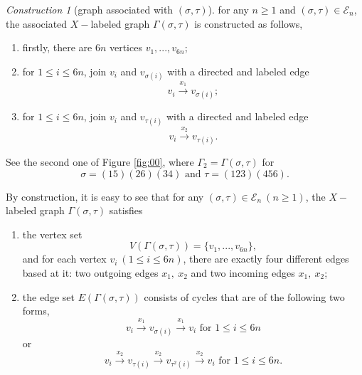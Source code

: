 \documentclass{amsart}
\theoremstyle{plain}
\theoremstyle{definition}
\theoremstyle{remark}
\newtheorem*{Cons*}{Construction}
\begin{document}
\begin{Cons*}[graph associated with $(\sigma,\tau)$]
    for any $n\geq 1$ and $(\sigma,\tau)\in\mathcal{E}_n$, the associated $X-$labeled graph $\Gamma(\sigma,\tau)$ is constructed as follows,
\begin{enumerate}
    \item  firstly, there are $6n$ vertices $v_1,...,v_{6n}$;
    \item for $1\leq i\leq 6n$, join $v_i$ and $v_{\sigma(i)}$ with a directed and labeled edge 
    $$v_i\overset{x_1}{\to}v_{\sigma(i)};$$
    \item for $1\leq i\leq 6n$, join $v_i$ and $v_{\tau(i)}$ with a directed and labeled edge 
    $$v_i\overset{x_2}{\to}v_{\tau(i)}.$$
\end{enumerate}
See the second one of Figure \ref{fig:00}, where $\Gamma_2=\Gamma(\sigma,\tau)$ for
$$\sigma=(15)(26)(34)\text{ and }\tau=(123)(456).$$
\end{Cons*}

\noindent By construction, it is easy to see that for any $(\sigma,\tau)\in\mathcal{E}_n\ (n\geq 1)$, the $X-$labeled graph $\Gamma(\sigma,\tau)$ satisfies 
\begin{enumerate}
    \item 
    the vertex set $$V(\Gamma(\sigma,\tau))=\{ v_1,...,v_{6n}\},$$ and for each vertex $v_i\ (1\leq i\leq 6n)$, there are exactly four different edges based at it: two outgoing edges $x_{1},\ x_{2}$ and two incoming edges $x_1,\ x_{2}$;
    \item the edge set $E(\Gamma(\sigma,\tau))$ consists of cycles that are of the following two forms,
    $$v_i\overset{x_1}{\to}v_{\sigma(i)}\overset{x_1}{\to}v_i\text{ for } 1\leq i\leq 6n$$
    or
    $$v_i\overset{x_2}{\to}v_{\tau(i)}\overset{x_2}{\to}v_{\tau^2(i)}\overset{x_2}{\to}v_i\text{ for } 1\leq i\leq 6n.$$
\end{enumerate}
\end{document}
